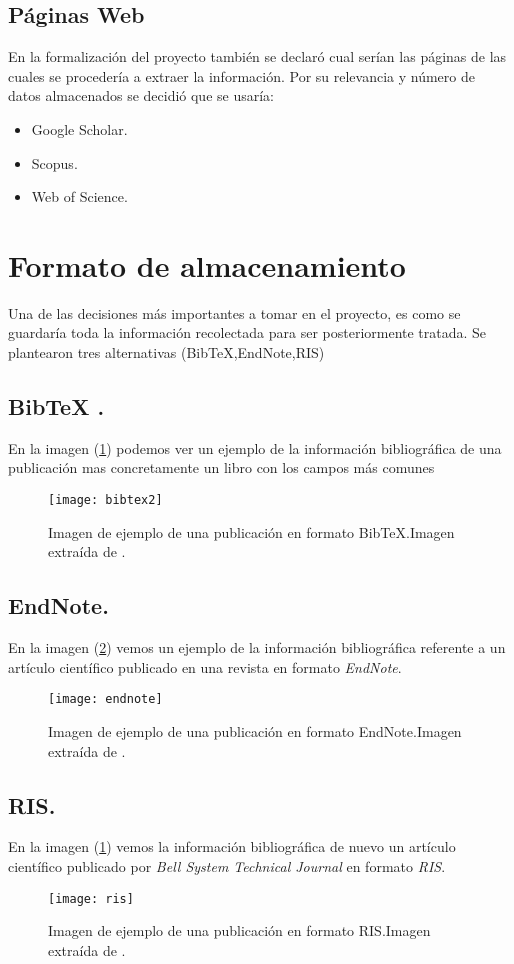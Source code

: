\subsection{Páginas Web}
En la formalización del proyecto también se declaró cual serían las páginas de las cuales se procedería a extraer la información. Por su relevancia y número de datos almacenados se decidió que se usaría:
\begin{itemize}
	\item Google Scholar.
	\item Scopus.
	\item Web of Science.
	
\end{itemize}

\section{Formato de almacenamiento}
Una de las decisiones más importantes a tomar en el proyecto, es como se guardaría toda la información recolectada para ser posteriormente tratada. Se plantearon tres alternativas (BibTeX,EndNote,RIS)
\subsection{BibTeX .}
En la imagen (\ref{fig:bibtex2}) podemos ver un ejemplo de la información bibliográfica de una publicación mas concretamente un libro con los campos más comunes 
	\begin{figure}[H]
		\centering
		\texttt{[image: bibtex2]}
		\caption{Imagen de ejemplo de una publicación en formato BibTeX.Imagen extraída de \cite{bibtex}.}
		\label{fig:bibtex2}
	\end{figure}
	
\subsection{EndNote.}
En la imagen (\ref{fig:endnote}) vemos un ejemplo de la información bibliográfica referente a un artículo científico publicado en una revista en formato \emph{EndNote}.
	\begin{figure}[H]
		\centering
		\texttt{[image: endnote]}
		\caption{Imagen de ejemplo de una publicación en formato EndNote.Imagen extraída de \cite{endnote}.}
		\label{fig:endnote}
	\end{figure}

\subsection{RIS.}
En la imagen (\ref{fig:bibtex2}) vemos la información bibliográfica de nuevo un artículo científico publicado por \emph{Bell System Technical Journal} en formato \emph{RIS}.
	\begin{figure}[H]
		\centering
		\texttt{[image: ris]}
		\caption{Imagen de ejemplo de una publicación en formato RIS.Imagen extraída de \cite{ris}.}
		\label{fig:ris}
	\end{figure}
	
